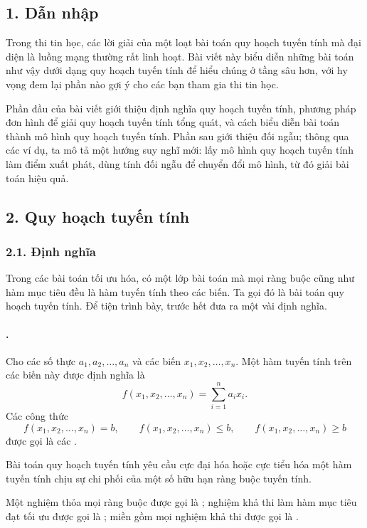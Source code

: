 \documentclass[11pt]{article}
\begin{document}
\subsection*{1. Dẫn nhập}

Trong thi tin học, các lời giải của một loạt bài toán quy hoạch tuyến tính mà
đại diện là luồng mạng thường rất linh hoạt. Bài viết này biểu diễn những bài
toán như vậy dưới dạng quy hoạch tuyến tính để hiểu chúng ở tầng sâu hơn, với
hy vọng đem lại phần nào gợi ý cho các bạn tham gia thi tin học.

Phần đầu của bài viết giới thiệu định nghĩa quy hoạch tuyến tính, phương pháp
đơn hình để giải quy hoạch tuyến tính tổng quát, và cách biểu diễn bài toán
thành mô hình quy hoạch tuyến tính. Phần sau giới thiệu đối ngẫu; thông qua
các ví dụ, ta mô tả một hướng suy nghĩ mới: lấy mô hình quy hoạch tuyến tính
làm điểm xuất phát, dùng tính đối ngẫu để chuyển đổi mô hình, từ đó giải bài
toán hiệu quả.

\subsection*{2. Quy hoạch tuyến tính}

\subsubsection*{2.1. Định nghĩa}

Trong các bài toán tối ưu hóa, có một lớp bài toán mà mọi ràng buộc cũng như
hàm mục tiêu đều là hàm tuyến tính theo các biến. Ta gọi đó là bài toán quy
hoạch tuyến tính. Để tiện trình bày, trước hết đưa ra một vài định nghĩa.

\paragraph{.}
Cho các số thực \(a_1,a_2,\ldots,a_n\) và các biến \(x_1,x_2,\ldots,x_n\).
Một hàm tuyến tính trên các biến này được định nghĩa là
\[
  f(x_1,x_2,\ldots,x_n)=\sum_{i=1}^{n} a_i x_i.
\]
Các công thức
\[
  f(x_1,x_2,\ldots,x_n)=b,\qquad
  f(x_1,x_2,\ldots,x_n)\le b,\qquad
  f(x_1,x_2,\ldots,x_n)\ge b
\]
được gọi là các .

Bài toán quy hoạch tuyến tính yêu cầu cực đại hóa hoặc cực tiểu hóa một hàm
tuyến tính chịu sự chi phối của một số hữu hạn ràng buộc tuyến tính.

Một nghiệm thỏa mọi ràng buộc được gọi là ; nghiệm khả
thi làm hàm mục tiêu đạt tối ưu được gọi là ; miền gồm
mọi nghiệm khả thi được gọi là .
\end{document}

